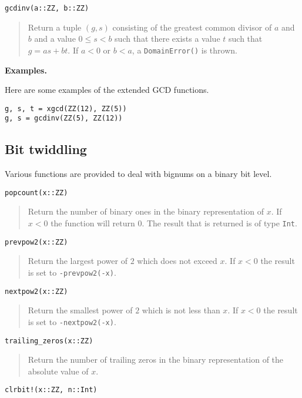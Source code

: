\documentclass[a4paper,10pt]{article}
\newcommand{\code}{\lstinline}
\newcommand{\desc}[1]{\vspace{-3mm}\begin{quote}#1\end{quote}}
\begin{document}
{{{{{{\begin{lstlisting}
gcdinv(a::ZZ, b::ZZ)
\end{lstlisting}

\desc{Return a tuple $(g, s)$ consisting of the greatest common divisor of $a$ and $b$
and a value $0 \leq s < b$ such that there exists a value $t$ such that 
$g = as + bt$. If $a < 0$ or $b < a$, a \code{DomainError()} is thrown.}

\textbf{Examples.}

Here are some examples of the extended GCD functions.

\begin{lstlisting}
g, s, t = xgcd(ZZ(12), ZZ(5))
g, s = gcdinv(ZZ(5), ZZ(12))
\end{lstlisting}

\subsection{Bit twiddling}

Various functions are provided to deal with bignums on a binary bit level.

\begin{lstlisting}
popcount(x::ZZ)
\end{lstlisting}

\desc{Return the number of binary ones in the binary representation of $x$. If $x < 0$ the
function will return $0$. The result that is returned is of type \code{Int}.}

\begin{lstlisting}
prevpow2(x::ZZ)
\end{lstlisting}

\desc{Return the largest power of $2$ which does not exceed $x$. If $x < 0$ the result is
set to \code{-prevpow2(-x)}.}

\begin{lstlisting}
nextpow2(x::ZZ)
\end{lstlisting}

\desc{Return the smallest power of $2$ which is not less than $x$. If $x < 0$ the result is
set to \code{-nextpow2(-x)}.}

\begin{lstlisting}
trailing_zeros(x::ZZ)
\end{lstlisting}

\desc{Return the number of trailing zeros in the binary representation of the absolute
value of $x$.}

\begin{lstlisting}
clrbit!(x::ZZ, n::Int)
\end{lstlisting}

}}}}}}
\end{document}
